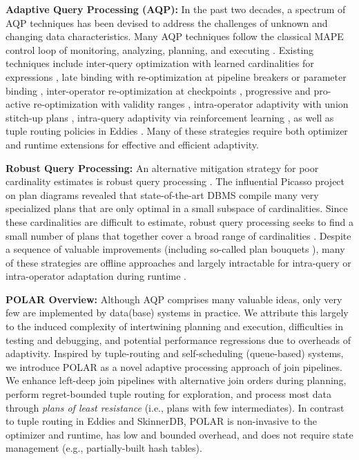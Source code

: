 \textbf{Adaptive Query Processing (AQP):} In the past two decades, a spectrum of AQP techniques \cite{BabuB05,DeshpandeIR07,IvesDR07,DeshpandeHR06} has been devised to address the challenges of unknown and changing data characteristics. Many AQP techniques follow the classical MAPE control loop of monitoring, analyzing, planning, and executing \cite{IvesDR07,mape05,AboulnagaHLLMPR04}. Existing techniques include inter-query optimization with learned cardinalities for expressions \cite{BrunoC02,ChenR94,StillgerLMK01}, late binding with re-optimization at pipeline breakers \cite{DeshpandeHR06} or parameter binding \cite{BizarroBD09}, inter-operator re-optimization at checkpoints \cite{KabraD98}, progressive and pro-active re-optimization with validity ranges \cite{MarklRSLP04,BabuBD05}, intra-operator adaptivity with union stitch-up plans \cite{IvesHW04}, intra-query adaptivity via reinforcement learning \cite{TrummerWMMJA19,TrummerWWMMJAR21,WeiT22}, as well as tuple routing policies in Eddies \cite{HellersteinA00,Arpaci-Dusseau03,Deshpande04,BizarroBDW05}. Many of these strategies require both optimizer and runtime extensions for effective and efficient adaptivity.

\textbf{Robust Query Processing:} An alternative mitigation strategy for poor cardinality estimates is robust query processing \cite{Haritsa20}. The influential Picasso project \cite{Haritsa10} on plan diagrams \cite{ReddyH05} revealed that state-of-the-art DBMS compile many very specialized plans that are only optimal in a small subspace of cardinalities. Since these cardinalities are difficult to estimate, robust query processing seeks to find a small number of plans that together cover a broad range of cardinalities \cite{DDH07,DDH08}. Despite a sequence of valuable improvements \cite{DDH08,AbhiramaBDSH10,GraefeGKP12,DuttH14} (including so-called plan bouquets \cite{DuttH14}), many of these strategies are offline approaches and largely intractable for intra-query or intra-operator adaptation during runtime \cite{Haritsa20}. 

\textbf{POLAR Overview:} Although AQP comprises many valuable ideas, only very few are implemented by data(base) systems in practice. We attribute this largely to the induced complexity of intertwining planning and execution, difficulties in testing and debugging, and potential performance regressions due to overheads of adaptivity. Inspired by tuple-routing and self-scheduling (queue-based) systems, we introduce POLAR as a novel adaptive processing approach of join pipelines. We enhance left-deep join pipelines with alternative join orders during planning, perform regret-bounded tuple routing for exploration, and process most data through \emph{plans of least resistance} (i.e., plans with few intermediates). In contrast to tuple routing in Eddies and SkinnerDB, POLAR is non-invasive to the optimizer and runtime, has low and bounded overhead, and does not require state management (e.g., partially-built hash tables).

